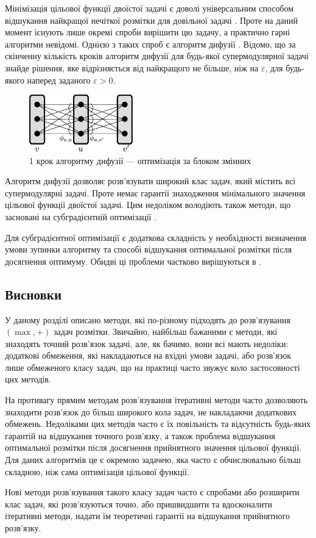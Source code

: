 Мінімізація цільової функції двоїстої задачі є доволі універсальним способом відшукання найкращої
нечіткої розмітки для довільної задачі \cite{diffusion_shlezinger,savchynskyy,SchlGig_1_usim2007}. Проте на даний момент існують лише окремі спроби вирішити цю задачу,
а практично гарні алгоритми невідомі.
Однією з таких спроб є алгоритм дифузії \cite{diffusion_shlezinger, savchynskyy}.
Відомо, що за скінченну кількість кроків алгоритм дифузії для будь-якої супермодулярної задачі
знайде рішення, яке відрізняється від найкращого не більше, ніж на $\varepsilon$,
для будь-якого наперед заданого $\varepsilon>0$.

\begin{figure}[h]
  \centering
  \includegraphics[width=0.4\textwidth]{images/One-elementary-step-of_diffusion.png}
  \caption{1 крок алгоритму дифузії --- оптимізація за блоком змінних \cite{ishikawa}}
  \label{fig:graph_example}
\end{figure}

Алгоритм дифузії дозволяє розв'язувати широкий клас задач, який містить всі
супермодулярні задачі. Проте немає гарантії знаходження мінімального
значення цільової функції двоїстої задачі. Цим недоліком володіють також
методи, що засновані на субградієнтній оптимізації \cite{Shor1985}.

Для субградієнтної оптимізації є додаткова складність у необхідності визначення
умови зупинки алгоритму та способі відшукання оптимальної розмітки
після досягнення оптимуму. Обидві ці проблеми частково вирішуються в \cite{lopatka_stop_cond}.

\subsection{Висновки}

У даному розділі описано методи, які по-різному підходять до
розв'язування \((\max,+)\) задач розмітки. Звичайно, найбільш бажаними є методи,
які знаходять точний розв'язок задачі, але, як бачимо, вони всі мають недоліки:
додаткові обмеження, які накладаються на вхідні умови задачі, або розв'язок
лише обмеженого класу задач, що на практиці часто звужує коло застосовності
цих методів.

На противагу прямим методам розв'язування ітеративні методи часто дозволяють
знаходити розв'язок до більш широкого кола задач, не накладаючи додаткових
обмежень. Недоліками цих методів часто є їх повільність та відсутність
будь-яких гарантій на відшукання точного розв'язку, а також проблема відшукання
оптимальної розмітки після досягнення прийнятного значення цільової функції.
Для даних алгоритмів це є окремою задачею, яка часто є обчислювально більш
складною, ніж сама оптимізація цільової функції.

Нові методи розв'язування такого класу задач часто є спробами або розширити
клас задач, які розв'язуються точно, або пришвидшити та вдосконалити
ітеративні методи, надати їм теоретичні гарантії на відшукання
прийнятного розв'язку.
